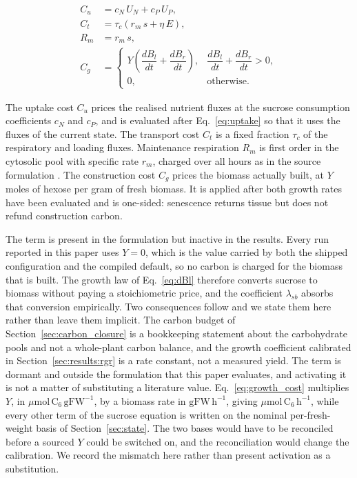 \begin{align}
C_u &= c_N\,U_N + c_P\,U_P ,
\label{eq:uptake_cost}\\[3pt]
C_t &= \tau_c\left(r_m\,s + \eta\,E\right),
\label{eq:transport_cost}\\[3pt]
R_m &= r_m\,s ,
\label{eq:respiration}\\[3pt]
C_g &=
\begin{cases}
Y\left(\dfrac{dB_l}{dt} + \dfrac{dB_r}{dt}\right), &
\dfrac{dB_l}{dt} + \dfrac{dB_r}{dt} > 0, \\[10pt]
0, & \text{otherwise} .
\end{cases}
\label{eq:growth_cost}
\end{align}

The uptake cost $C_u$ prices the realised nutrient fluxes at the sucrose
consumption coefficients $c_N$ and $c_P$, and is evaluated after
Eq.~\eqref{eq:uptake} so that it uses the fluxes of the current state. The
transport cost $C_t$ is a fixed fraction $\tau_c$ of the respiratory and loading
fluxes. Maintenance respiration $R_m$ is first order in the cytosolic pool with
specific rate $r_m$, charged over all hours as in the source formulation
\citep{Tedone2020}. The construction cost $C_g$ prices the biomass actually
built, at $Y$ moles of hexose per gram of fresh biomass. It is applied after both
growth rates have been evaluated and is one-sided: senescence returns tissue but
does not refund construction carbon.

The term is present in the formulation but inactive in the results. Every run
reported in this paper uses $Y = 0$, which is the value carried by both the
shipped configuration and the compiled default, so no carbon is charged for the
biomass that is built. The growth law of Eq.~\eqref{eq:dBl} therefore converts
sucrose to biomass without paying a stoichiometric price, and the coefficient
$\lambda_{sb}$ absorbs that conversion empirically. Two consequences follow and
we state them here rather than leave them implicit. The carbon budget of
Section~\ref{sec:carbon_closure} is a bookkeeping statement about the
carbohydrate pools and not a whole-plant carbon balance, and the growth
coefficient calibrated in Section~\ref{sec:results:rgr} is a rate constant, not
a measured yield. The term is dormant and outside the formulation that this paper
evaluates, and activating it is not a matter of substituting a literature value.
Eq.~\eqref{eq:growth_cost} multiplies $Y$, in $\mu\mathrm{mol\,C_6\,gFW^{-1}}$,
by a biomass rate in $\mathrm{gFW\,h^{-1}}$, giving
$\mu\mathrm{mol\,C_6\,h^{-1}}$, while every other term of the sucrose equation
is written on the nominal per-fresh-weight basis of
Section~\ref{sec:state}. The two bases would have to be reconciled before
a sourced $Y$ could be switched on, and the reconciliation would change the
calibration. We record the mismatch here rather than present activation as a
substitution.

